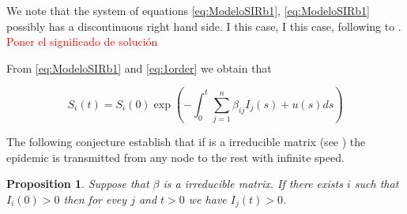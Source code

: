 \documentclass[a4paper,10pt]{article}
\newtheorem{prop}[thm]{Proposition}
\theoremstyle{remark}
\begin{document}
  
We  note that the system of equations \eqref{eq:ModeloSIRb1}, \eqref{eq:ModeloSIRb1} possibly has a discontinuous right hand side. I this case,  I this case, following to \cite{A.F.Filippov512}. \textcolor{red}{Poner el significado de solución}
  




From  \eqref{eq:ModeloSIRb1} and \eqref{eq:1order} we obtain that

\[
 S_i(t)=S_i(0)
 \exp\left(
    -\int_0^t\sum\limits_{j=1}^{n} \beta_{i j} I_{j}(s)+ u(s)ds
    \right)
\]




The following conjecture establish that if is a irreducible matrix (see \cite{CarlD.Meyer538}) the epidemic is transmitted from any node to the rest with infinite speed.


\begin{prop} Suppose that $\beta$ is a irreducible matrix. If there exists $i$ such that $I_i(0)>0$ then for evey $j$ and $t>0$ we have $I_j(t)>0$.
\end{prop}
 
\end{document}
